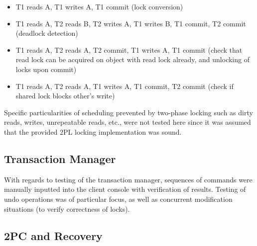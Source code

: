 \documentclass[11pt]{article}
\begin{document}
\begin{itemize}
\item T1 reads A, T1 writes A, T1 commit (lock conversion)
\item T1 reads A, T2 reads B, T2 writes A, T1 writes B, T1 commit, T2 commit (deadlock detection)
\item T1 reads A, T2 reads A, T2 commit, T1 writes A, T1 commit (check that read lock can be acquired on object with read lock already, and unlocking of locks upon commit)
\item T1 reads A, T2 reads A, T1 writes A, T1 commit, T2 commit (check if shared lock blocks other's write)
\end{itemize}

Specific particularities of scheduling prevented by two-phase locking such as dirty reads, writes, unrepeatable reads, etc., were not tested here since it was assumed that the provided 2PL locking implementation was sound. \par

\subsection*{Transaction Manager}

With regards to testing of the transaction manager, sequences of commands were manually inputted into the client console with verification of results. Testing of undo operations was of particular focus, as well as concurrent modification situations (to verify correctness of locks).\par

\subsection*{2PC and Recovery}
\end{document}
